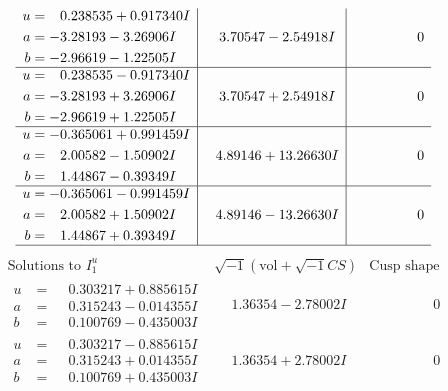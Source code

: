 \documentclass[1p]{elsarticle_modified}
\theoremstyle{definition}
\newcommand{\I}{\sqrt{-1}}
\begin{document}
$$\begin{array}{c|c|c}
\begin{aligned}
u &= \phantom{-}0.238535 + 0.917340 I \\
a &= -3.28193 - 3.26906 I \\
b &= -2.96619 - 1.22505 I\end{aligned}
 & \phantom{-}3.70547 - 2.54918 I & \phantom{-0.000000 } 0 \\ \hline\begin{aligned}
u &= \phantom{-}0.238535 - 0.917340 I \\
a &= -3.28193 + 3.26906 I \\
b &= -2.96619 + 1.22505 I\end{aligned}
 & \phantom{-}3.70547 + 2.54918 I & \phantom{-0.000000 } 0 \\ \hline\begin{aligned}
u &= -0.365061 + 0.991459 I \\
a &= \phantom{-}2.00582 - 1.50902 I \\
b &= \phantom{-}1.44867 - 0.39349 I\end{aligned}
 & \phantom{-}4.89146 + 13.26630 I & \phantom{-0.000000 } 0 \\ \hline\begin{aligned}
u &= -0.365061 - 0.991459 I \\
a &= \phantom{-}2.00582 + 1.50902 I \\
b &= \phantom{-}1.44867 + 0.39349 I\end{aligned}
 & \phantom{-}4.89146 - 13.26630 I & \phantom{-0.000000 } 0\\
 \hline 
 \end{array}$$\newpage$$\begin{array}{c|c|c}  
\text{Solutions to }I^u_{1}& \I (\text{vol} + \sqrt{-1}CS) & \text{Cusp shape}\\
 \hline 
\begin{aligned}
u &= \phantom{-}0.303217 + 0.885615 I \\
a &= \phantom{-}0.315243 - 0.014355 I \\
b &= \phantom{-}0.100769 - 0.435003 I\end{aligned}
 & \phantom{-}1.36354 - 2.78002 I & \phantom{-0.000000 } 0 \\ \hline\begin{aligned}
u &= \phantom{-}0.303217 - 0.885615 I \\
a &= \phantom{-}0.315243 + 0.014355 I \\
b &= \phantom{-}0.100769 + 0.435003 I\end{aligned}
 & \phantom{-}1.36354 + 2.78002 I & \phantom{-0.000000 } 0 \\ \hline\begin{aligned}

\end{aligned}
\end{array}$$
\end{document}
